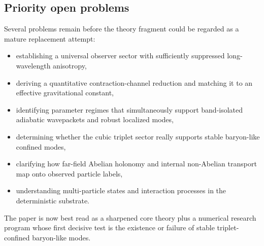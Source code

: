 \subsection{Priority open problems}

Several problems remain before the theory fragment could be regarded as a mature replacement attempt:
\begin{itemize}
\item establishing a universal observer sector with sufficiently suppressed long-wavelength anisotropy,
\item deriving a quantitative contraction-channel reduction and matching it to an effective gravitational constant,
\item identifying parameter regimes that simultaneously support band-isolated adiabatic wavepackets
and robust localized modes,
\item determining whether the cubic triplet sector really supports stable baryon-like confined modes,
\item clarifying how far-field Abelian holonomy and internal non-Abelian transport map onto observed particle labels,
\item understanding multi-particle states and interaction processes in the deterministic substrate.
\end{itemize}
The paper is now best read as a sharpened core theory plus a numerical research program whose first decisive test is the
existence or failure of stable triplet-confined baryon-like modes.
